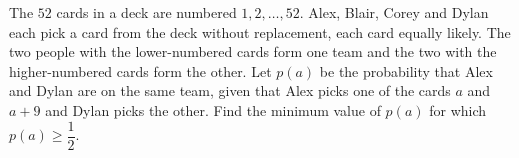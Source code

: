 The $52$ cards in a deck are numbered $1,2,\dots,52$. Alex, Blair, Corey and Dylan each pick a card from the deck without replacement, each card equally likely. The two people with the lower-numbered cards form one team and the two with the higher-numbered cards form the other. Let $p(a)$ be the probability that Alex and Dylan are on the same team, given that Alex picks one of the cards $a$ and $a+9$ and Dylan picks the other. Find the minimum value of $p(a)$ for which $p(a)\ge\dfrac{1}{2}$.
